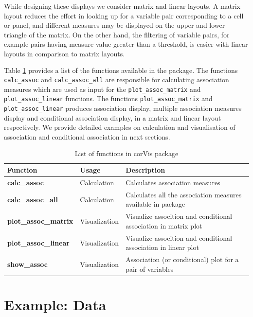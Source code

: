 While designing these displays we consider matrix and linear layouts. A
matrix layout reduces the effort in looking up for a variable pair
corresponding to a cell or panel, and different measures may be
displayed on the upper and lower triangle of the matrix. On the other
hand, the filtering of variable pairs, for example pairs having measure
value greater than a threshold, is easier with linear layouts in
comparison to matrix layouts.

Table \ref{tab:function-corVis} provides a list of the functions
available in the package. The functions \texttt{calc\_assoc} and
\texttt{calc\_assoc\_all} are responsible for calculating association
measures which are used as input for the \texttt{plot\_assoc\_matrix}
and \texttt{plot\_assoc\_linear} functions. The functions
\texttt{plot\_assoc\_matrix} and \texttt{plot\_assoc\_linear} produces
association display, multiple association measures display and
conditional association display, in a matrix and linear layout
respectively. We provide detailed examples on calculation and
visualisation of association and conditional association in next
sections.

\begin{Schunk}
\begin{table}

\caption{\label{tab:function-corVis}List of functions in corVis package}
\centering
\begin{tabular}[t]{>{}lll}
\toprule
Function & Usage & Description\\
\midrule
\textbf{calc\_assoc} & Calculation & Calculates association measures\\
\textbf{calc\_assoc\_all} & Calculation & Calculates all the association measures available in package\\
\textbf{plot\_assoc\_matrix} & Visualization & Visualize assocition and conditional association in matrix plot\\
\textbf{plot\_assoc\_linear} & Visualization & Visualize assocition and conditional association in linear plot\\
\textbf{show\_assoc} & Visualization & Association (or conditional) plot for a pair of variables\\
\bottomrule
\end{tabular}
\end{table}

\end{Schunk}

\hypertarget{example-data}{%
\section{Example: Data}\label{example-data}}

